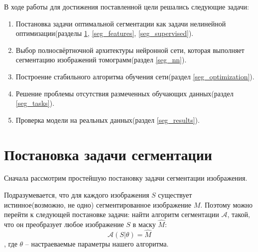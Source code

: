 \documentclass[14pt, a4paper, oneside, bold]{extarticle}
\makeatletter
\newcommand{\problemtitle}[1]{\gdef\@problemtitle{#1}}%
\newcommand{\probleminput}[1]{\gdef\@probleminput{#1}}%
\newcommand{\problemquestion}[1]{\gdef\@problemquestion{#1}}%
\makeatother
\begin{document}
В ходе работы для достижения поставленной цели решались следующие 
задачи:
\begin{enumerate}
	\item Постановка задачи оптимальной сегментации как задачи нелинейной оптимизации(разделы \ref{seg_def}, \ref{seg_features}, \ref{seg_supervised}).
	
	\item Выбор полносвёртночной архитектуры нейронной сети, 
которая выполняет сегментацию изображений томограмм(раздел \ref{seg_nn}).

	\item Построение стабильного алгоритма обучения сети(раздел \ref{seg_optimization}).
	
	\item Решение проблемы отсутствия размеченных обучающих данных(раздел \ref{seg_tasks}).
	
	\item Проверка модели на реальных данных(раздел \ref{seg_results}).
	
\end{enumerate}
  
\newpage


\section{Постановка задачи сегментации} \label{seg_def}

Сначала рассмотрим простейшую постановку задачи сегментации изображения.

\begin{problem}
  \problemtitle{\textbf{Задача сегментации изображения}}
  \probleminput{изображение 
	$S = (s_{ij})_{i=1, j=1}^{H, W},\ s_{ij} \in [0, 1]$, где 
$H$ -- высота изображения, $W$ -- ширина изображения.}
  \problemquestion{для каждого пикселя соответствующий ему сегмент изображения, 
т.е. соответствие $s_{ij} \rightarrow m_{ij},\ m_{ij} \in C = \{ 0, ... , N_c-1 \} $,
где $N_c$ -- число различных сегментов.
}
\end{problem}

Подразумевается, что для каждого изображения $S$ существует 
истинное(возможно, не одно) сегментированное изображение $M$.
Поэтому можно перейти к следующей постановке задачи: найти алгоритм сегментации $\mathcal{A}$, такой, что он преобразует любое 
изображение $S$ в  маску $\hat{M}$:
\begin{equation}
	\mathcal{A}(S | \theta) = \hat{M}
\end{equation} 
, где $\theta$ -- настраеваемые параметры нашего алгоритма.
\end{document}
